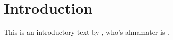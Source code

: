 \documentclass{article}
\begin{document}
\section{Introduction}

This is an introductory text by , who's almamater is .
\end{document}
